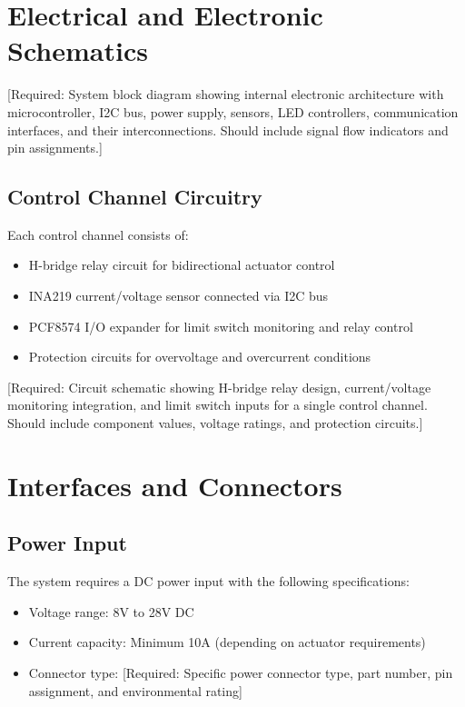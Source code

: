 \documentclass[12pt,a4paper,twoside,openright]{book}
\begin{document}
\section{Electrical and Electronic Schematics}

{\color{missingred}[Required: System block diagram showing internal electronic architecture with microcontroller, I2C bus, power supply, sensors, LED controllers, communication interfaces, and their interconnections. Should include signal flow indicators and pin assignments.]}

\subsection{Control Channel Circuitry}
Each control channel consists of:
\begin{itemize}
    \item H-bridge relay circuit for bidirectional actuator control
    \item INA219 current/voltage sensor connected via I2C bus
    \item PCF8574 I/O expander for limit switch monitoring and relay control
    \item Protection circuits for overvoltage and overcurrent conditions
\end{itemize}

{\color{missingred}[Required: Circuit schematic showing H-bridge relay design, current/voltage monitoring integration, and limit switch inputs for a single control channel. Should include component values, voltage ratings, and protection circuits.]}

\section{Interfaces and Connectors}

\subsection{Power Input}
The system requires a DC power input with the following specifications:
\begin{itemize}
    \item Voltage range: 8V to 28V DC
    \item Current capacity: Minimum 10A (depending on actuator requirements)
    \item Connector type: {\color{missingred}[Required: Specific power connector type, part number, pin assignment, and environmental rating]}
\end{itemize}
\end{document}
